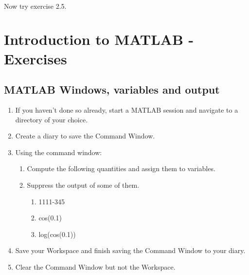 \documentclass[11pt]{amsart}
\begin{document}
\

Now try exercise 2.5.


\clearpage
\section{Introduction to MATLAB - Exercises}

\subsection{MATLAB Windows, variables and output}
\begin{enumerate}
\item If you haven't done so already, start a MATLAB session and navigate to a directory of your choice.
\item Create a diary to save the Command Window.
\item Using the command window:
	\begin{enumerate}
	\item Compute the following quantities and assign them to variables.
	\item Suppress the output of some of them.
		\begin{enumerate}
		\item 1111-345
		\item cos(0.1)
		\item log(cos(0.1))
		\end{enumerate}
	\end{enumerate}
\item Save your Workspace and finish saving the Command Window to your diary.
\item Clear the Command Window but not the Workspace.
\end{enumerate}
\end{document}
